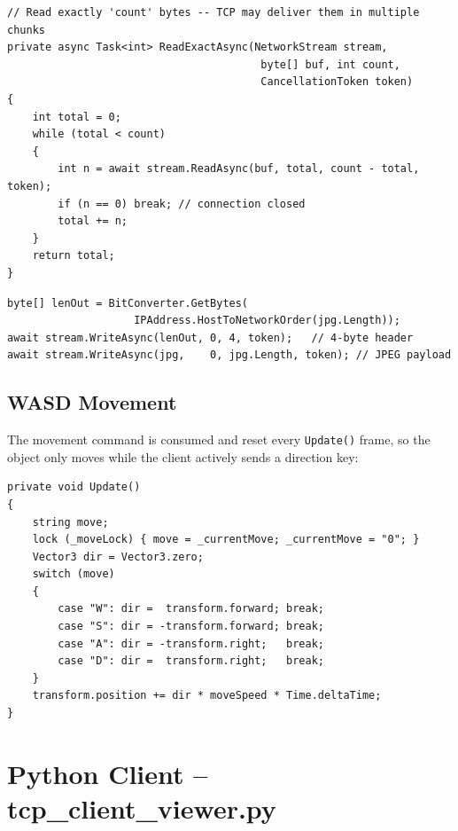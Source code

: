 \documentclass[12pt,a4paper]{article}
\begin{document}
\begin{lstlisting}[style=csharp, caption={Reading a length-prefixed message from the TCP stream.}]
// Read exactly 'count' bytes -- TCP may deliver them in multiple chunks
private async Task<int> ReadExactAsync(NetworkStream stream,
                                        byte[] buf, int count,
                                        CancellationToken token)
{
    int total = 0;
    while (total < count)
    {
        int n = await stream.ReadAsync(buf, total, count - total, token);
        if (n == 0) break; // connection closed
        total += n;
    }
    return total;
}
\end{lstlisting}

\begin{lstlisting}[style=csharp, caption={Sending the JPEG response with length prefix.}]
byte[] lenOut = BitConverter.GetBytes(
                    IPAddress.HostToNetworkOrder(jpg.Length));
await stream.WriteAsync(lenOut, 0, 4, token);   // 4-byte header
await stream.WriteAsync(jpg,    0, jpg.Length, token); // JPEG payload
\end{lstlisting}

\subsection{WASD Movement}

The movement command is consumed and reset every \texttt{Update()} frame, so the
object only moves while the client actively sends a direction key:

\begin{lstlisting}[style=csharp, caption={Movement applied and reset on the Unity main thread.}]
private void Update()
{
    string move;
    lock (_moveLock) { move = _currentMove; _currentMove = "0"; }
    Vector3 dir = Vector3.zero;
    switch (move)
    {
        case "W": dir =  transform.forward; break;
        case "S": dir = -transform.forward; break;
        case "A": dir = -transform.right;   break;
        case "D": dir =  transform.right;   break;
    }
    transform.position += dir * moveSpeed * Time.deltaTime;
}
\end{lstlisting}

\section{Python Client -- tcp\_client\_viewer.py}
\end{document}
